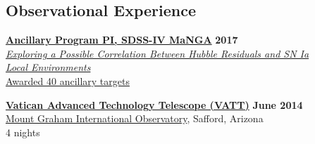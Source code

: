 \documentclass[margin]{res}
\begin{document}
\begin{resume}






\section{Observational Experience}

{\href{http://www.sdss.org/dr13/manga/}{\bf Ancillary Program PI, SDSS-IV MaNGA}} \hfill \textbf{2017} \\
\href{https://trac.sdss.org/wiki/MANGA/Survey/AncillaryPrograms2017/Rose_SNIa_Environments_and_HR}{\textit{Exploring a Possible Correlation Between Hubble Residuals and SN Ia \\Local Environments}}\\
\href{http://www.sdss.org/dr14/manga/manga-target-selection/ancillary-targets/}{Awarded 40 ancillary targets}

{\href{http://vaticanobservatory.org/VATT/}{\bf  Vatican Advanced Technology Telescope (VATT)}} \hfill \textbf{June 2014} \\
\href{http://mgio.arizona.edu}{Mount Graham International Observatory}, Safford, Arizona \\
4 nights











\end{resume}
\end{document}
